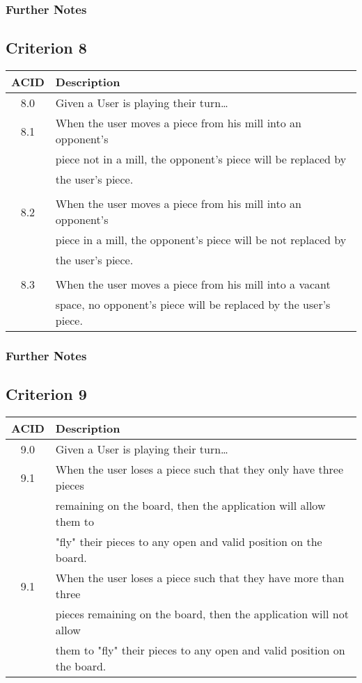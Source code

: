 \documentclass[11pt]{article}
\begin{document}
\subsubsection*{Further Notes}
\label{sec:orgc94cb42}
\subsection{Criterion 8}
\label{sec:org8bd6e5b}
\begin{center}
\begin{tabular}{|c|l|}
ACID & Description\\
\hline
8.0 & Given a User is playing their turn\ldots{}\\
\hline
8.1 & When the user moves a piece from his mill into an opponent's\\
 & piece not in a mill, the opponent's piece will be replaced by\\
 & the user's piece.\\
 & \\
8.2 & When the user moves a piece from his mill into an opponent's\\
 & piece in a mill, the opponent's piece will be not replaced by\\
 & the user's piece.\\
 & \\
8.3 & When the user moves a piece from his mill into a vacant\\
 & space, no opponent's piece will be replaced by the user's piece.\\
\end{tabular}
\end{center}

\subsubsection*{Further Notes}
\label{sec:orgbeede17}

\subsection{Criterion 9}
\label{sec:org1254c3a}
\begin{center}
\begin{tabular}{|c|l|}
ACID & Description\\
\hline
9.0 & Given a User is playing their turn\ldots{}\\
\hline
9.1 & When the user loses a piece such that they only have three pieces\\
 & remaining on the board, then the application will allow them to\\
 & "fly" their pieces to any open and valid position on the board.\\
9.1 & When the user loses a piece such that they have more than three\\
 & pieces remaining on the board, then the application will not allow\\
 & them to "fly" their pieces to any open and valid position on the board.\\
\end{tabular}
\end{center}
\end{document}
